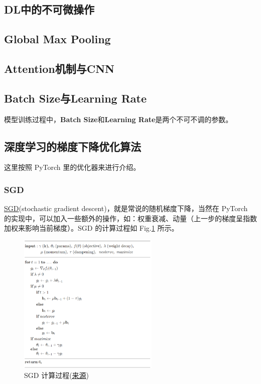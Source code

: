 \subsection{DL中的不可微操作}

\subsection{Global Max Pooling}

\subsection{Attention机制与CNN}

\subsection{Batch Size与Learning Rate}
模型训练过程中，\textbf{Batch Size}和\textbf{Learning Rate}是两个不可不调的参数。


\subsection{深度学习的梯度下降优化算法}
这里按照 PyTorch 里的优化器来进行介绍。
\subsubsection{SGD}
\href{https://pytorch.org/docs/stable/generated/torch.optim.SGD.html#torch.optim.SGD}{SGD}(stochastic gradient descent)，就是常说的随机梯度下降，当然在 PyTorch 的实现中，可以加入一些额外的操作，如：权重衰减、动量（上一步的梯度呈指数加权来影响当前梯度）。SGD 的计算过程如 Fig.\ref{fig:sgd} 所示。

\begin{figure}[h]
	\centering
	\includegraphics[width=0.6\textwidth]{pics/sgd.png}
	\caption{SGD 计算过程(\href{https://pytorch.org/docs/stable/generated/torch.optim.SGD.html#torch.optim.SGD}{来源})}
	\label{fig:sgd}
\end{figure}

